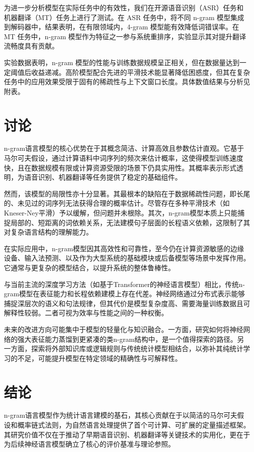 \documentclass[10pt,a4paper,twocolumn]{article}
\begin{document}
为进一步分析模型在实际任务中的有效性，我们在开源语音识别（ASR）任务和机器翻译（MT）任务上进行了测试。在 ASR 任务中，将不同 n-gram 模型集成到解码器中，结果表明，在有限领域内，4-gram 模型能有效降低词错误率。在 MT 任务中，n-gram 模型作为特征之一参与系统重排序，实验显示其对提升翻译流畅度具有贡献\cite{anonndoch2003minimum}。

实验数据表明，n-gram 模型的性能与训练数据规模呈正相关，但在数据量达到一定阈值后收益递减。高阶模型配合先进的平滑技术能显著降低困惑度，但其在复杂任务中的应用效果受限于固有的稀疏性与上下文窗口长度。具体数值结果与分析见附表。


\section{ 讨论 }
n-gram语言模型的核心优势在于其概念简洁、计算高效且参数估计直观。它基于马尔可夫假设，通过计算语料中词序列的频次来估计概率，这使得模型训练速度快，且在数据规模有限或计算资源受限的场景下仍具实用性\cite{anonndchen1996empirical}。其概率表示形式透明，为语音识别、机器翻译等任务提供了稳定的基础组件\cite{anonndjelinek1990self}。

然而，该模型的局限性亦十分显著。其最根本的缺陷在于数据稀疏性问题，即长尾的、未见过的词序列无法获得合理的概率估计。尽管存在多种平滑技术（如Kneser-Ney平滑）予以缓解，但问题并未根除\cite{anonndkneser1995improved}。其次，n-gram模型本质上只能捕捉局部的、短距离的词依赖关系，无法建模句子层面的长程语义依赖，这限制了其对复杂语言结构的理解能力。

在实际应用中，n-gram模型因其高效性和可靠性，至今仍在计算资源敏感的边缘设备、输入法预测、以及作为大型系统的基础模块或后备模型等场景中发挥作用。它通常与更复杂的模型结合，以提升系统的整体鲁棒性。

与当前主流的深度学习方法（如基于Transformer的神经语言模型）相比，传统n-gram模型在表征能力和长程依赖建模上存在代差。神经网络通过分布式表示能够捕捉深层次的语义和句法规律，但其代价是模型复杂度高、需要海量训练数据且可解释性较弱。二者可视为效率与性能之间的一种权衡。

未来的改进方向可能集中于模型的轻量化与知识融合。一方面，研究如何将神经网络的强大表征能力蒸馏到更紧凑的类n-gram结构中，是一个值得探索的路径\cite{anonndbengio2003neural}。另一方面，探索将外部知识库或逻辑规则与传统统计模型相结合，以弥补其纯统计学习的不足，可能提升模型在特定领域的精确性与可解释性。


\section{ 结论 }
n-gram语言模型作为统计语言建模的基石，其核心贡献在于以简洁的马尔可夫假设和概率链式法则，为自然语言处理提供了首个可计算、可扩展的定量描述框架\cite{anonndchen1996empirical}。其研究价值不仅在于推动了早期语音识别、机器翻译等关键技术的实用化，更在于为后续神经语言模型确立了核心的评价基准与理论参照。
\end{document}
